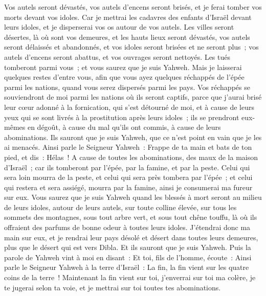 \begin{multicols}{2}
Vos autels seront dévastés, vos autels d'encens seront brisés, et je ferai tomber vos morts devant vos idoles.
Car je mettrai les cadavres des enfants d'Israël devant leurs idoles, et je disperserai vos os autour de vos autels.
Les villes seront désertes, là où sont vos demeures, et les hauts lieux seront dévastés, vos autels seront délaissés et abandonnés, et vos idoles seront brisées et ne seront plus~; vos autels d'encens seront abattus, et vos ouvrages seront nettoyés.
Les tués tomberont parmi vous~; et vous saurez que je suis Yahweh.
Mais je laisserai quelques restes d'entre vous, afin que vous ayez quelques réchappés de l'épée parmi les nations, quand vous serez dispersés parmi les pays.
Vos réchappés se souviendront de moi parmi les nations où ils seront captifs, parce que j'aurai brisé leur cœur adonné à la fornication, qui s'est détourné de moi, et à cause de leurs yeux qui se sont livrés à la prostitution après leurs idoles~; ils se prendront eux-mêmes en dégoût, à cause du mal qu'ils ont commis, à cause de leurs abominations.
Ils sauront que je suis Yahweh, que ce n'est point en vain que je les ai menacés.
Ainsi parle le Seigneur Yahweh~: Frappe de ta main et bats de ton pied, et dis~: Hélas~! A cause de toutes les abominations, des maux de la maison d'Israël~; car ils tomberont par l'épée, par la famine, et par la peste.
Celui qui sera loin mourra de la peste, et celui qui sera près tombera par l'épée~; et celui qui restera et sera assiégé, mourra par la famine, ainsi je consumerai ma fureur sur eux.
Vous saurez que je suis Yahweh quand les blessés à mort seront au milieu de leurs idoles, autour de leurs autels, sur toute colline élevée, sur tous les sommets des montagnes, sous tout arbre vert, et sous tout chêne touffu, là où ils offraient des parfums de bonne odeur à toutes leurs idoles.
J'étendrai donc ma main sur eux, et je rendrai leur pays désolé et désert dans toutes leurs demeures, plus que le désert qui est vers Dibla. Et ils sauront que je suis Yahweh.
\VerseOne{}Puis la parole de Yahweh vint à moi en disant~:
Et toi, fils de l'homme, écoute~: Ainsi parle le Seigneur Yahweh à la terre d'Israël~: La fin, la fin vient sur les quatre coins de la terre~!
Maintenant la fin vient sur toi, j'enverrai sur toi ma colère, je te jugerai selon ta voie, et je mettrai sur toi toutes tes abominations.

\end{multicols}
